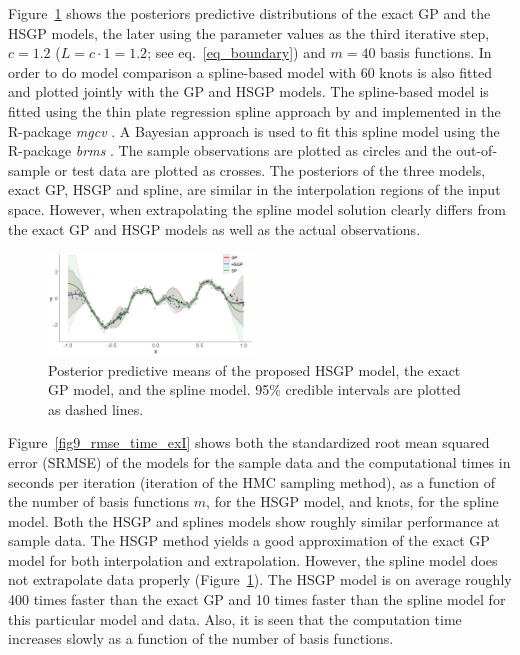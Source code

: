 Figure~\ref{fig8_Posteriors_exI} shows the posteriors predictive distributions of the exact GP and the HSGP models, the later using the parameter values as the third iterative step, $c=1.2$ ($L=c\cdot 1= 1.2$; see eq.~\eqref{eq_boundary}) and $m=40$ basis functions. In order to do model comparison a spline-based model with 60 knots is also fitted and plotted jointly with the GP and HSGP models. The spline-based model is fitted using the thin plate regression spline approach by \citet{wood2003thin} and implemented in the R-package \textit{mgcv} \citep{wood2011mgcv}. A Bayesian approach is used to fit this spline model using the R-package \textit{brms} \citep{burkner2017brms}. The sample observations are plotted as circles and the out-of-sample or test data are plotted as crosses. The posteriors of the three models, exact GP, HSGP and spline, are similar in the interpolation regions of the input space. However, when extrapolating the spline model solution clearly differs from the exact GP and HSGP models as well as the actual observations. 

\begin{figure}
\centering
\includegraphics[width=0.485\textwidth]{fig8_Posteriors_exI.png}
\caption{Posterior predictive means of the proposed HSGP model, the exact GP model, and the spline model. 95\% credible intervals are plotted as dashed lines.}
  \label{fig8_Posteriors_exI}
\end{figure}

Figure~\ref{fig9_rmse_time_exI} shows both the standardized root mean squared error (SRMSE) of the models for the sample data and the computational times in seconds per iteration (iteration of the HMC sampling method), as a function of the number of basis functions $m$, for the HSGP model, and knots, for the spline model. Both the HSGP and splines models show roughly similar performance at sample data. The HSGP method yields a good approximation of the exact GP model for both interpolation and extrapolation. However, the spline model does not extrapolate data properly (Figure~\ref{fig8_Posteriors_exI}). The HSGP model is on average roughly 400 times faster than the exact GP and 10 times faster than the spline model for this particular model and data. Also, it is seen that the computation time increases slowly as a function of the number of basis functions.

